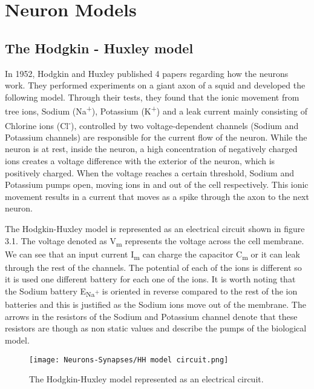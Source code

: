 \documentclass[12pt]{report}
\begin{document}
\section{Neuron Models}
\subsection{The Hodgkin - Huxley model}
In 1952, Hodgkin and Huxley published 4 papers regarding how the neurons work\cite{Johnson2017}. They performed experiments on a giant axon of a squid and developed the following model. Through their tests, they found that the ionic movement from tree ions, Sodium (Na\textsuperscript{+}), Potassium (K\textsuperscript{+}) and a leak current mainly consisting of Chlorine ions (Cl\textsuperscript{-}), controlled by two voltage-dependent channels (Sodium and Potassium channels) are responsible for the current flow of the neuron. While the neuron is at rest, inside the neuron, a high concentration of negatively charged ions creates a voltage difference with the exterior of the neuron, which is positively charged. When the voltage reaches a certain threshold, Sodium and Potassium pumps open, moving ions in and out of the cell respectively. This ionic movement results in a current that moves as a spike through the axon to the next neuron.

The Hodgkin-Huxley model is represented as an electrical circuit shown in figure 3.1. The voltage denoted as V\textsubscript{m} represents the voltage across the cell membrane. We can see that an input current I\textsubscript{m} can charge the capacitor C\textsubscript{m} or it can leak through the rest of the channels. The potential of each of the ions is different so it is used one different battery for each one of the ions. It is worth noting that the Sodium battery E\textsubscript{Na\textsuperscript{+}} is oriented in reverse compared to the rest of the ion batteries and this is justified as the Sodium ions move out of the membrane. The arrows in the resistors of the Sodium and Potassium channel denote that these resistors are though as non static values and describe the pumps of the biological model.

\begin{figure}[htp]
    \centering
    \texttt{[image: Neurons-Synapses/HH model circuit.png]}
    \caption{The Hodgkin-Huxley model represented as an electrical circuit.}
    \label{fig:neurons-multipolar}
\end{figure}
\end{document}
